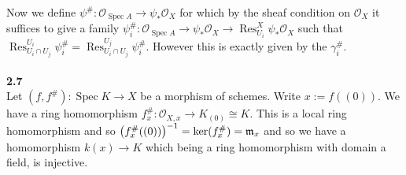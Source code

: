 \documentclass[12pt]{article}
\numberwithin{thm}{subsection}
\numberwithin{defn}{subsection}
\numberwithin{lemma}{subsection}
\numberwithin{example}{subsection}
\numberwithin{notation}{subsection}
\numberwithin{cor}{subsection}
\numberwithin{remark}{subsection}
\numberwithin{condition}{subsection}
\numberwithin{question}{subsection}
\numberwithin{construction}{subsection}
\numberwithin{construction}{subsection}
\numberwithin{construction}{subsection}
\newcommand{\call}[1]{\mathcal{#1}}
\newcommand{\lto}{\longrightarrow}
\begin{document}
Now we define $\psi^{\#}: \call{O}_{\operatorname{Spec}A} \to \psi_\ast\call{O}_{X}$ for which by the sheaf condition on $\call{O}_X$ it suffices to give a family $\psi^{\#}_i: \call{O}_{\operatorname{Spec}A} \to \psi_\ast\call{O}_X \to \operatorname{Res}^X_{U_i}\psi_\ast\call{O}_X$ such that $\operatorname{Res}^{U_i}_{U_i \cap U_j}\psi^{\#}_i = \operatorname{Res}^{U_j}_{U_i \cap U_j}\psi_i^{\#}$. However this is exactly given by the $\gamma_i^{\#}$.\\\\
%
\textbf{2.7}\\
Let $(f,f^{\#}): \operatorname{Spec}K \to X$ be a morphism of schemes. Write $x := f((0))$. We have a ring homomorphism $f^{\#}_x: \call{O}_{X,x}\lto  K_{(0)} \cong K$. This is a local ring homomorphism and so $\big(f^{\#}_x((0))\big)^{-1} = \operatorname{ker}(f^{\#}_x) = \frak{m}_x$ and so we have a homomorphism $k(x) \lto K$ which being a ring homomorphism with domain a field, is injective.
\end{document}
